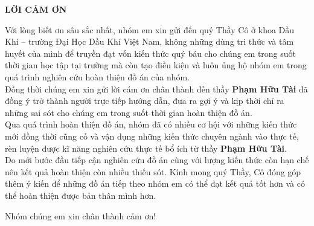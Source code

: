 \documentclass[12pt,a4paper]{article}
\begin{document}
\clearpage

\thispagestyle{empty}

\begin{center}
	\centering
	\textbf{LỜI CẢM ƠN}
\end{center}
Với lòng biết ơn sâu sắc nhất, nhóm em xin gửi đến quý Thầy Cô ở khoa Dầu Khí –
trường Đại Học Dầu Khí Việt Nam, không những dùng tri thức và tâm huyết của mình để truyền đạt vốn kiến thức quý báu cho chúng em trong suốt thời gian học tập tại trường mà còn tạo điều kiện và luôn ủng hộ nhóm em trong quá trình nghiên cứu hoàn thiện đồ án của nhóm. \\
Đồng thời chúng em xin gửi lời cám ơn chân thành đến thầy \textbf{Phạm Hữu Tài} đã đồng ý trở thành người trực tiếp hướng dẫn, đưa ra gợi ý và kịp thời chỉ ra những sai sót cho chúng em trong suốt thời gian hoàn thiện đồ án.\\
Qua quá trình hoàn thiện đồ án, nhóm đã có nhiều cơ hội với những kiến thức mới đồng thời cũng cố và vận dụng những kiến thức chuyên ngành vào thực tế, rèn luyện được kĩ năng nghiên cứu thực tế bổ ích từ thầy \textbf{Phạm Hữu Tài}.\\
Do mới bước đầu tiếp cận nghiên cứu đồ án cùng với lượng kiến thức còn hạn chế nên kết quả hoàn thiện còn nhiều thiếu sót. Kính mong quý Thầy, Cô đóng góp thêm ý kiến để những đồ án tiếp theo nhóm em có thể đạt kết quả tốt hơn và có thể hoàn thiện được bản thân mình hơn.
\begin{flushright}
Nhóm chúng em xin chân thành cảm ơn!
\end{flushright}

\newpage
\end{document}
